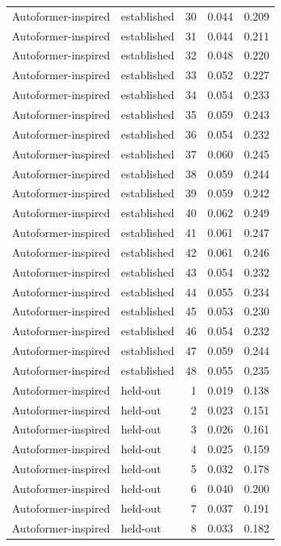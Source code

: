 \begin{tabular}{llrrr}
Autoformer-inspired & established & 30 & 0.044 & 0.209 \\
Autoformer-inspired & established & 31 & 0.044 & 0.211 \\
Autoformer-inspired & established & 32 & 0.048 & 0.220 \\
Autoformer-inspired & established & 33 & 0.052 & 0.227 \\
Autoformer-inspired & established & 34 & 0.054 & 0.233 \\
Autoformer-inspired & established & 35 & 0.059 & 0.243 \\
Autoformer-inspired & established & 36 & 0.054 & 0.232 \\
Autoformer-inspired & established & 37 & 0.060 & 0.245 \\
Autoformer-inspired & established & 38 & 0.059 & 0.244 \\
Autoformer-inspired & established & 39 & 0.059 & 0.242 \\
Autoformer-inspired & established & 40 & 0.062 & 0.249 \\
Autoformer-inspired & established & 41 & 0.061 & 0.247 \\
Autoformer-inspired & established & 42 & 0.061 & 0.246 \\
Autoformer-inspired & established & 43 & 0.054 & 0.232 \\
Autoformer-inspired & established & 44 & 0.055 & 0.234 \\
Autoformer-inspired & established & 45 & 0.053 & 0.230 \\
Autoformer-inspired & established & 46 & 0.054 & 0.232 \\
Autoformer-inspired & established & 47 & 0.059 & 0.244 \\
Autoformer-inspired & established & 48 & 0.055 & 0.235 \\
Autoformer-inspired & held-out & 1 & 0.019 & 0.138 \\
Autoformer-inspired & held-out & 2 & 0.023 & 0.151 \\
Autoformer-inspired & held-out & 3 & 0.026 & 0.161 \\
Autoformer-inspired & held-out & 4 & 0.025 & 0.159 \\
Autoformer-inspired & held-out & 5 & 0.032 & 0.178 \\
Autoformer-inspired & held-out & 6 & 0.040 & 0.200 \\
Autoformer-inspired & held-out & 7 & 0.037 & 0.191 \\
Autoformer-inspired & held-out & 8 & 0.033 & 0.182 \\

\end{tabular}

